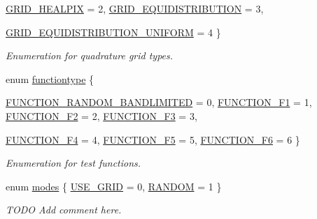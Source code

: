 \begin{CompactItemize}
\hyperlink{group__applications__quadratureS2__test_gg4cf30b0362e85bc0154ca2c52b2bc17ea78fe7c57d63c3bc881ebd8d54d0fe03}{GRID\_\-HEALPIX} =  2, 
\hyperlink{group__applications__quadratureS2__test_gg4cf30b0362e85bc0154ca2c52b2bc17ed75cb0bf79d47f9c5a51ae0f4e2277ef}{GRID\_\-EQUIDISTRIBUTION} =  3, 
\par
\hyperlink{group__applications__quadratureS2__test_gg4cf30b0362e85bc0154ca2c52b2bc17e23366f0e437b1001093d9ba5216c1748}{GRID\_\-EQUIDISTRIBUTION\_\-UNIFORM} =  4
 \}
\begin{CompactList}\small\item\em Enumeration for quadrature grid types. \item\end{CompactList}\item 
enum \hyperlink{group__applications__quadratureS2__test_ga7c9498e1664b6773fd8f9d850921e20}{functiontype} \{ \par
\hyperlink{group__applications__quadratureS2__test_gga7c9498e1664b6773fd8f9d850921e20f32453e74162eabd52a6bb27092b98f5}{FUNCTION\_\-RANDOM\_\-BANDLIMITED} =  0, 
\hyperlink{group__applications__quadratureS2__test_gga7c9498e1664b6773fd8f9d850921e206e5321b83ba46d16398c25e4644f8231}{FUNCTION\_\-F1} =  1, 
\hyperlink{group__applications__quadratureS2__test_gga7c9498e1664b6773fd8f9d850921e205686ce8b1e0f50c525a1973218f65ca7}{FUNCTION\_\-F2} =  2, 
\hyperlink{group__applications__quadratureS2__test_gga7c9498e1664b6773fd8f9d850921e20ecd8db1ad350acd43cbdaad6f39b5afa}{FUNCTION\_\-F3} =  3, 
\par
\hyperlink{group__applications__quadratureS2__test_gga7c9498e1664b6773fd8f9d850921e202c9be3af474b4c222dd2942a53d26291}{FUNCTION\_\-F4} =  4, 
\hyperlink{group__applications__quadratureS2__test_gga7c9498e1664b6773fd8f9d850921e20a966daa718086741f2d0258c36d2433b}{FUNCTION\_\-F5} =  5, 
\hyperlink{group__applications__quadratureS2__test_gga7c9498e1664b6773fd8f9d850921e20ecdc7e8c0447c9f412bbcbfa05066e4a}{FUNCTION\_\-F6} =  6
 \}
\begin{CompactList}\small\item\em Enumeration for test functions. \item\end{CompactList}\item 
enum \hyperlink{group__applications__quadratureS2__test_g811fe196a5d9d37857c2f8adeeaac3c6}{modes} \{ \hyperlink{group__applications__quadratureS2__test_gg811fe196a5d9d37857c2f8adeeaac3c61df7f7d70a21620c0c5434cf7fdafb66}{USE\_\-GRID} =  0, 
\hyperlink{group__applications__quadratureS2__test_gg811fe196a5d9d37857c2f8adeeaac3c6a2b65445a3a16f164c5e811064d75726}{RANDOM} =  1
 \}
\begin{CompactList}\small\item\em TODO Add comment here. \item\end{CompactList}\end{CompactItemize}
